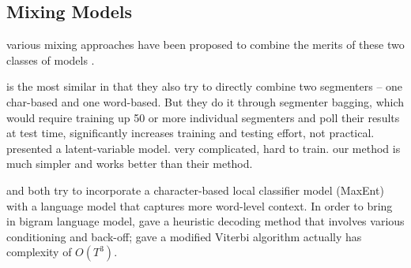 \subsection{Mixing Models} various mixing approaches have been proposed to combine the merits of these two classes of models \cite{Wang:2006:SIGHAN,Lin:2009:CICLing,Sun:2009:HLT-NAACL,Sun:2010:COLING,Wang:2010:COLING}. 

\cite{Sun:2009:HLT-NAACL} is the most similar in that they also try to directly combine two segmenters -- one char-based and one word-based. But they do it through segmenter bagging, which would require training up 50 or more individual segmenters and poll their results at test time, significantly increases training and testing effort, not practical.
\cite{Sun:2009:HLT-NAACL} presented a latent-variable model. very complicated, hard to train. our method is much simpler and works better than their method.

\cite{Lin:2009:CICLing} and \cite{Wang:2006:SIGHAN} both try to incorporate a character-based local classifier model (MaxEnt) with a language model that captures more word-level context.
In order to bring in bigram language model,   gave a heuristic decoding method that involves various conditioning and back-off;  gave a modified Viterbi algorithm actually has complexity of $O(T^3)$. 
